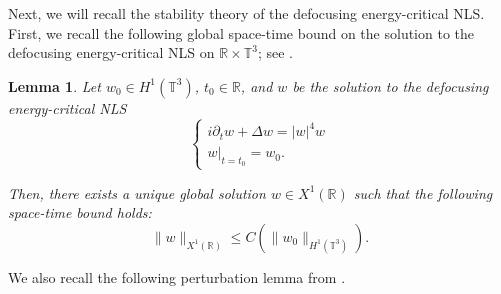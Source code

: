 \documentclass[letterpaper, 11pt,  reqno]{amsart}
\newtheorem{lemma}[theorem]{Lemma}
\newtheorem{proposition}[theorem]{Proposition}
\newcommand{\1}{\hspace{0.5mm}\text{I}\hspace{0.5mm}}
\newcommand{\noi}{\noindent}
\newcommand{\R}{\mathbb{R}}
\newcommand{\T}{\mathbb{T}}
\newcommand{\HS}{\textup{HS}}
\newcommand{\pa}{\partial}
\numberwithin{equation}{section}
\numberwithin{theorem}{section}
\begin{document}
Next,
we will recall the stability theory of the defocusing energy-critical NLS. 
First, we recall the following global space-time bound on the solution to the defocusing energy-critical NLS on $\R\times\T^3$;
see \cite[Theorem 1.1]{IP12}.









\begin{lemma}\label{st-bound}
Let 
$w_0\in H^1(\T^3)$,
$t_0 \in \R$,
and
$w$ be the solution to the defocusing energy-critical NLS
\begin{equation}\label{Eq:w NLS}
\begin{cases}
    i\pa_t w+\Delta w=|w|^{4}w \\
  w|_{t=t_0}=w_0.
\end{cases}
\end{equation}


\noi
Then, there exists a unique global solution $w\in X^1(\R)$ such that 
the following space-time bound holds:
\begin{equation*}
    \|w\|_{X^1(\R)}\leq C(\|w_0\|_{H^1(\T^3)}).
\end{equation*}
\end{lemma}



We also recall the following perturbation lemma from 
\cite[Proposition 3.4]{IP12}.
\end{document}
